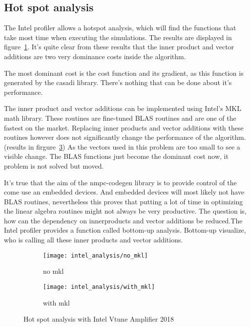 \subsection{Hot spot analysis}
The Intel profiler allows a hotspot analysis, which will find the functions that take most time when executing the simulations. The results are displayed in figure~\ref{fig:hotspot no mkl}.  It's quite clear from these results that the inner product and vector additions are two very dominance costs inside the algorithm.

The most dominant cost is the cost function and its gradient, as this function is generated by the casadi library. There's nothing that can be done about it's performance.

The inner product and vector additions can be implemented using Intel's MKL math library. These routines are fine-tuned BLAS routines and are one of the fastest on the market. Replacing inner products and vector additions with these routines however does not significantly change the performance of the algorithm.(results in firgure~\ref{fig:hotspot with mkl}) As the vectors used in this problem are too small to see a visible change. The BLAS functions just become the dominant cost now, it problem is not solved but moved.

It's true that the aim of the nmpc-codegen library is to provide control of the come use an embedded devices. And embedded devices will most likely not have BLAS routines, nevertheless this proves that putting a lot of time in optimizing the linear algebra routines might not always be very productive. The question is, how can the dependency on innerproducts and vector additions be reduced.The Intel profiler provides a function called bottom-up analysis. Bottom-up visualize, who is calling all these inner products and vector additions.

\begin{figure}[H]
	\centering
	\begin{subfigure}[b]{0.45\textwidth}
		\centering
		\texttt{[image: intel\_analysis/no\_mkl]}
		\caption{no mkl}
		\label{fig:hotspot no mkl}
	\end{subfigure}
	\hfill
	\begin{subfigure}[b]{0.45\textwidth}
		\centering
		\texttt{[image: intel\_analysis/with\_mkl]}
		\caption{with mkl}
		\label{fig:hotspot with mkl}
	\end{subfigure}
	\caption{Hot spot analysis with Intel Vtune Amplifier 2018}
\end{figure}


